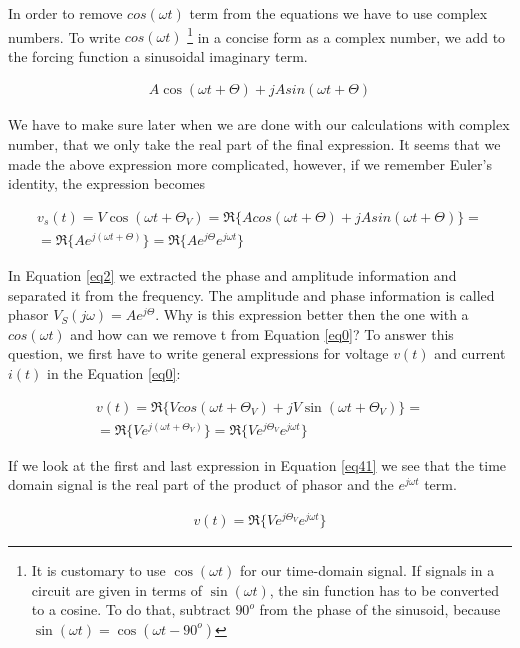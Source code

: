 \documentclass{ximera}
\begin{document}
\begin{example}
 In order to remove $cos (\omega t)$  term from the equations 
we have to use complex numbers.  To write $cos (\omega t)$ \footnote{It is customary to use  $\cos( \omega t)$ for our time-domain signal. If signals in a circuit are given in terms of $\sin (\omega t)$, the sin function has to be converted to a cosine. To do that, subtract $90^o$ from the phase of the sinusoid, because $\sin( \omega t) = \cos(\omega t - 90^o)$}  in a concise form  as a complex number, we add to the forcing function  a sinusoidal imaginary term.

\begin{eqnarray}
 A \cos (\omega t + \Theta ) + j A sin (\omega t + \Theta)
\end{eqnarray}

We have to make sure later  when we are done with our calculations with complex number, that we only take the real part of the final expression. It seems that we made the above expression more complicated,  however, if we
remember Euler's identity, the expression becomes


\begin{eqnarray}
v_s(t)=  V \cos (\omega t + \Theta_V)=\Re\{ A cos (\omega t + \Theta ) + j A sin (\omega t + \Theta)\}= \nonumber \\ 
= \Re\{A e^{j(\omega t + \Theta)}\}=\Re\{A e^{j \Theta} e^{j \omega t}\} \label{eq2}
\end{eqnarray}

In Equation \ref{eq2}  we  extracted the phase and amplitude information
and separated it from the frequency. The amplitude and phase information is called phasor $V_S (j \omega)=A e^{j \Theta}$. 
Why is this expression better then the one with a $cos(\omega t)$ and how can we remove t from  Equation \ref{eq0}? To answer this question, we first have to write general expressions for voltage $v(t)$ and current $ i(t)$ in the Equation \ref{eq0}:

\begin{eqnarray}
v(t)= \Re\{ V cos (\omega t + \Theta_V ) + j V \sin (\omega t + \Theta_V)\}= \nonumber \\ =\Re\{V e^{j(\omega t + \Theta_V)}\}=\Re\{V e^{j \Theta_V} e^{j \omega t}\} \label{eq41}
\end{eqnarray}

If we look at the first and last expression in Equation \ref{eq41} we see that the time domain signal is  the real part of the product of phasor and  the $e^{j \omega t}$ term. 

\begin{eqnarray}
v(t)=\Re\{V e^{j \Theta_V} e^{j \omega t}\} \label{eq41a} 
\end{eqnarray}


\end{example}
\end{document}
